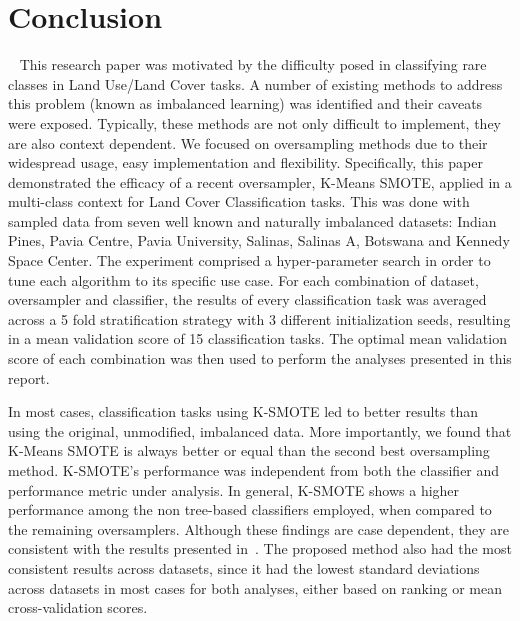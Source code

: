\documentclass[parskip=full]{scrartcl}
\begin{document}

\section{Conclusion}~\label{sec:conclusion} 
This research paper was motivated by the difficulty posed in classifying rare
classes in Land Use/Land Cover tasks. A number of existing methods to address
this problem (known as imbalanced learning) was identified and their caveats
were exposed.  Typically, these methods are not only difficult to implement,
they are also context dependent. We focused on oversampling methods due to their
widespread usage, easy implementation and flexibility.  Specifically, this paper
demonstrated the efficacy of a recent oversampler, K-Means SMOTE, applied in a
multi-class context for Land Cover Classification tasks. This was done with
sampled data from seven well known and naturally imbalanced datasets: Indian
Pines, Pavia Centre, Pavia University, Salinas, Salinas A, Botswana and Kennedy
Space Center. The experiment comprised a hyper-parameter search in order to tune
each algorithm to its specific use case. For each combination of dataset,
oversampler and classifier, the results of every classification task was
averaged across a 5 fold stratification strategy with 3 different initialization
seeds, resulting in a mean validation score of 15 classification tasks.  The
optimal mean validation score of each combination was then used to perform the
analyses presented in this report.

In most cases, classification tasks using K-SMOTE led to better results than
using the original, unmodified, imbalanced data. More importantly, we found that
K-Means SMOTE is always better or equal than the second best oversampling
method. K-SMOTE's performance was independent from both the classifier and
performance metric under analysis. In general, K-SMOTE shows a higher
performance among the non tree-based classifiers employed, when compared to the
remaining oversamplers. Although these findings are case dependent, they are
consistent with the results presented in~\cite{Douzas2018}. The proposed method
also had the most consistent results across datasets, since it had the lowest
standard deviations across datasets in most cases for both analyses, either
based on ranking or mean cross-validation scores.
\end{document}

